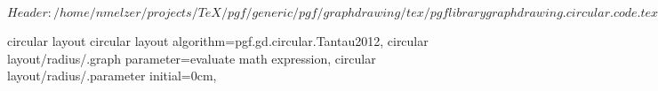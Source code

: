 %
%
%

\ProvidesFileRCS[v\pgfversion] $Header: /home/nmelzer/projects/TeX/pgf/generic/pgf/graphdrawing/tex/pgflibrarygraphdrawing.circular.code.tex,v 1.2 2012/04/19 13:49:07 tantau Exp $



%
%
\pgfgddeclarealgorithmkey
  {circular layout}
  {circular layout}
  {
    algorithm=pgf.gd.circular.Tantau2012,
    circular layout/radius/.graph parameter=evaluate math expression,
    circular layout/radius/.parameter initial=0cm,
  }



\endinput